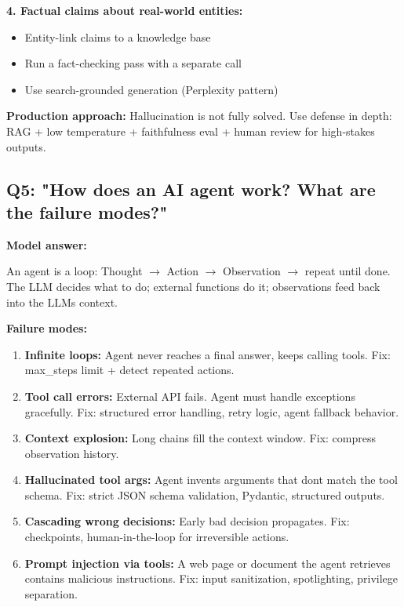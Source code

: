 \documentclass[11pt]{article}
\providecommand{\tightlist}{\setlength{\itemsep}{1pt}\setlength{\parskip}{0pt}}
\begin{document}
\textbf{4. Factual claims about real-world entities:}

\begin{itemize}
\tightlist
\item
  Entity-link claims to a knowledge base
\item
  Run a fact-checking pass with a separate call
\item
  Use search-grounded generation (Perplexity pattern)
\end{itemize}

\textbf{Production approach:} Hallucination is not fully solved. Use defense in depth: RAG + low temperature + faithfulness eval + human review for high-stakes outputs.

\subsection{Q5: "How does an AI agent work? What are the failure modes?"}\label{q5-how-does-an-ai-agent-work-what-are-the-failure-modes}

\textbf{Model answer:}

An agent is a loop: Thought \(\rightarrow\) Action \(\rightarrow\) Observation \(\rightarrow\) repeat until done. The LLM decides what to do; external functions do it; observations feed back into the LLM\textquotesingle s context.

\textbf{Failure modes:}

\begin{enumerate}
\def\labelenumi{\arabic{enumi}.}
\tightlist
\item
  \textbf{Infinite loops:} Agent never reaches a final answer, keeps calling tools. Fix: max\_steps limit + detect repeated actions.
\item
  \textbf{Tool call errors:} External API fails. Agent must handle exceptions gracefully. Fix: structured error handling, retry logic, agent fallback behavior.
\item
  \textbf{Context explosion:} Long chains fill the context window. Fix: compress observation history.
\item
  \textbf{Hallucinated tool args:} Agent invents arguments that don\textquotesingle t match the tool schema. Fix: strict JSON schema validation, Pydantic, structured outputs.
\item
  \textbf{Cascading wrong decisions:} Early bad decision propagates. Fix: checkpoints, human-in-the-loop for irreversible actions.
\item
  \textbf{Prompt injection via tools:} A web page or document the agent retrieves contains malicious instructions. Fix: input sanitization, spotlighting, privilege separation.
\end{enumerate}
\end{document}
